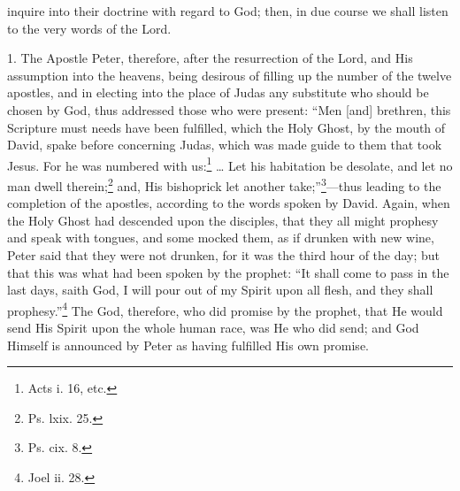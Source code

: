 inquire into their doctrine with regard to God; then, in due course we shall listen to the very words of the Lord.


1. The Apostle Peter, therefore, after the resurrection of the Lord, and His assumption into the heavens, being desirous of filling up the number of the twelve apostles, and in electing into the place of Judas any substitute who should be chosen by God, thus addressed those who were present: “Men [and] brethren, this Scripture must needs have been fulfilled, which the Holy Ghost, by the mouth of David, spake before concerning Judas, which was made guide to them that took Jesus. For he was numbered with us:\footnote{Acts i. 16, etc.} … Let his habitation be desolate,  and let no man dwell therein;\footnote{Ps. lxix. 25.} and, His bishoprick let another take;”\footnote{Ps. cix. 8.}—thus leading to the completion of the apostles, according to the words spoken by David. Again, when the Holy Ghost had descended upon the disciples, that they all might prophesy and speak with tongues, and some mocked them, as if drunken with new wine, Peter said that they were not drunken, for it was the third hour of the day; but that this was what had been spoken by the prophet: “It shall come to pass in the last days, saith God, I will pour out of my Spirit upon all flesh, and they shall prophesy.”\footnote{Joel ii. 28.} The God, therefore, who did promise by the prophet, that He would send His Spirit upon the whole human race, was He who did send; and God Himself is announced by Peter as having fulfilled His own promise.

